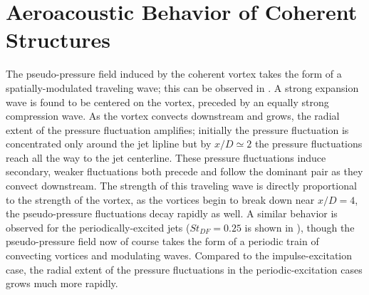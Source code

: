 \section{Aeroacoustic Behavior of Coherent Structures}
The pseudo-pressure field induced by the coherent vortex takes the form of a spatially-modulated traveling wave; this can be observed in .
A strong expansion wave is found to be centered on the vortex, preceded by an equally strong compression wave.
As the vortex convects downstream and grows, the radial extent of the pressure fluctuation amplifies; initially the pressure fluctuation is concentrated only around the jet lipline but by $x/D \simeq 2$ the pressure fluctuations reach all the way to the jet centerline.
These pressure fluctuations induce secondary, weaker fluctuations both precede and follow the dominant pair as they convect downstream.
The strength of this traveling wave is directly proportional to the strength of the vortex, as the vortices begin to break down near $x/D = 4$, the pseudo-pressure fluctuations decay rapidly as well. 
A similar behavior is observed for the periodically-excited jets ($St_{DF} = 0.25$ is shown in ), though the pseudo-pressure field now of course takes the form of a periodic train of convecting vortices and modulating waves.
Compared to the impulse-excitation case, the radial extent of the pressure fluctuations in the periodic-excitation cases grows much more rapidly.
